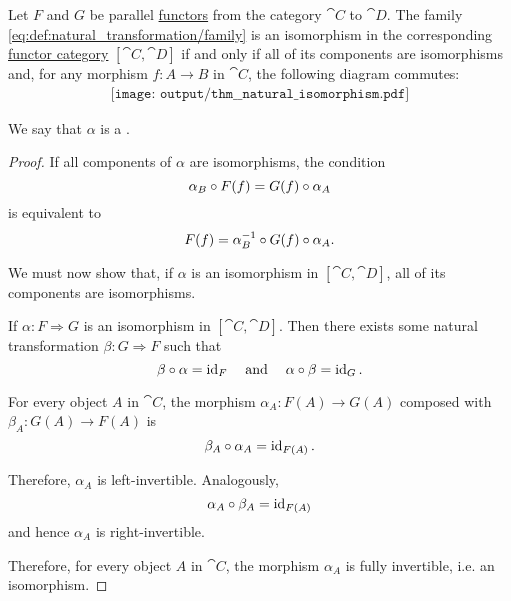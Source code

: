 \begin{proposition}\label{thm:natural_isomorphism}
  Let \( F \) and \( G \) be parallel \hyperref[def:functor]{functors} from the category \( \cat{C} \) to \( \cat{D} \). The family \eqref{eq:def:natural_transformation/family} is an isomorphism in the corresponding \hyperref[def:functor_category]{functor category} \( [\cat{C}, \cat{D}] \) if and only if all of its components are isomorphisms and, for any morphism \( f: A \to B \) in \( \cat{C} \), the following diagram commutes:
  \begin{equation}\label{eq:thm:natural_isomorphism/diagram}
    \begin{aligned}
      \texttt{[image: output/thm\_\_natural\_isomorphism.pdf]}
    \end{aligned}
  \end{equation}

  We say that \( \alpha \) is a .
\end{proposition}
\begin{proof}
  If all components of \( \alpha \) are isomorphisms, the condition
  \begin{equation*}
    \alpha_B \bincirc F(f) = G(f) \bincirc \alpha_A
  \end{equation*}
  is equivalent to
  \begin{equation*}
    F(f) = \alpha_B^{-1} \bincirc G(f) \bincirc \alpha_A.
  \end{equation*}

  We must now show that, if \( \alpha \) is an isomorphism in \( [\cat{C}, \cat{D}] \), all of its components are isomorphisms.

  If \( \alpha: F \Rightarrow G \) is an isomorphism in \( [\cat{C}, \cat{D}] \). Then there exists some natural transformation \( \beta: G \Rightarrow F \) such that
  \begin{equation*}
    \beta \bincirc \alpha = \id_F \quad\T{and}\quad \alpha \bincirc \beta = \id_G.
  \end{equation*}

  For every object \( A \) in \( \cat{C} \), the morphism \( \alpha_A: F(A) \to G(A) \) composed with \( \beta_A: G(A) \to F(A) \) is
  \begin{equation*}
    \beta_A \bincirc \alpha_A = \id_{F(A)}.
  \end{equation*}

  Therefore, \( \alpha_A \) is left-invertible. Analogously,
  \begin{equation*}
    \alpha_A \bincirc \beta_A = \id_{F(A)}
  \end{equation*}
  and hence \( \alpha_A \) is right-invertible.

  Therefore, for every object \( A \) in \( \cat{C} \), the morphism \( \alpha_A \) is fully invertible, i.e. an isomorphism.
\end{proof}

